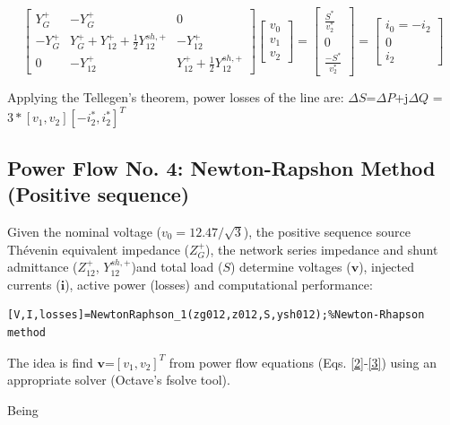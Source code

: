 \documentclass[12pt]{article}
\begin{document}
\begin{equation}
 \left[ \begin{array}{ccc}\label{1}
 {Y}^{+}_{G} & - {Y}^{+}_{G}  &0 \\
 - {Y}^{+}_{G} &  {Y}^{+}_{G}+{Y}^{+}_{12}+\frac{1}{2}{Y}^{sh,+}_{12} & -{Y}^{+}_{12}\\
 0 & -{Y}^{+}_{12} & {Y}^{+}_{12}+\frac{1}{2}{Y}^{sh,+}_{12}
             \end{array}
           \right]
  \begin{bmatrix}
  {v}_0\\ 
	{v}_1\\ 
	{v}_2
\end{bmatrix}
  =
     \begin{bmatrix} 
   \frac{{S}^*}{{v}^*_2} \\ 
  0\\ 
  \frac{-{S}^*}{{v}^*_2}
  \end{bmatrix}=
  \begin{bmatrix}
{i}_0=-{i}_2\\ 
0\\ 
{i}_2
\end{bmatrix}
  \end{equation}


Applying the Tellegen's theorem, power losses of the line are: $\Delta {S}$=$\Delta P$+j$\Delta Q$ 
=$3*[{v}_1,{v}_2][-{i}^*_2,{i}^*_2]^T$

\subsection{Power Flow No. 4: Newton-Rapshon Method (Positive sequence)}

Given the nominal voltage ($v_0=12.47/\sqrt{3}$), the positive sequence source Th\'evenin equivalent impedance (${Z}^{+}_{G}$), the network series impedance and shunt admittance (${Z}^{+}_{12}$, ${Y}^{sh,+}_{12}$)and total load (${S}$)
determine voltages ($\bm{v}$), injected currents ($\mathbf{i}$), active power (losses) and computational performance:
    
\begin{verbatim}
[V,I,losses]=NewtonRaphson_1(zg012,z012,S,ysh012);%Newton-Rhapson method
\end{verbatim}

The idea is find $\bm{v}$=$[{v}_1,{v}_2]^T$ from power flow equations (Eqs. \ref{2}-\ref{3}) using an appropriate solver (Octave's {fsolve} tool).

Being  
\end{document}
